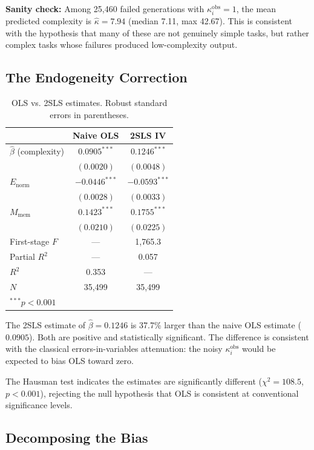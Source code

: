\documentclass[conference]{IEEEtran}
\begin{document}
\textbf{Sanity check:} Among 25,460 failed generations with $\kappa_i^{\text{obs}} = 1$, the mean predicted complexity is $\hat{\kappa} = 7.94$ (median 7.11, max 42.67). This is consistent with the hypothesis that many of these are not genuinely simple tasks, but rather complex tasks whose failures produced low-complexity output.

\subsection{The Endogeneity Correction}

\begin{table}[h]
\centering
\caption{OLS vs. 2SLS estimates. Robust standard errors in parentheses.}
\label{tab:2sls}
\begin{tabular}{@{}lcc@{}}
\toprule
 & \textbf{Naive OLS} & \textbf{2SLS IV} \\
\midrule
$\hat{\beta}$ (complexity) & $0.0905^{***}$ & $0.1246^{***}$ \\
 & $(0.0020)$ & $(0.0048)$ \\
$E_{\text{norm}}$ & $-0.0446^{***}$ & $-0.0593^{***}$ \\
 & $(0.0028)$ & $(0.0033)$ \\
$M_{\text{mem}}$ & $0.1423^{***}$ & $0.1755^{***}$ \\
 & $(0.0210)$ & $(0.0225)$ \\
\midrule
First-stage $F$ & --- & 1,765.3 \\
Partial $R^2$ & --- & 0.057 \\
$R^2$ & 0.353 & --- \\
$N$ & 35,499 & 35,499 \\
\bottomrule
\multicolumn{3}{l}{\footnotesize $^{***}p < 0.001$}
\end{tabular}
\end{table}

The 2SLS estimate of $\hat{\beta} = 0.1246$ is 37.7\% larger than the naive OLS estimate ($0.0905$). Both are positive and statistically significant. The difference is consistent with the classical errors-in-variables attenuation: the noisy $\kappa_i^{\text{obs}}$ would be expected to bias OLS toward zero.

The Hausman test indicates the estimates are significantly different ($\chi^2 = 108.5$, $p < 0.001$), rejecting the null hypothesis that OLS is consistent at conventional significance levels.

\subsection{Decomposing the Bias}
\end{document}
